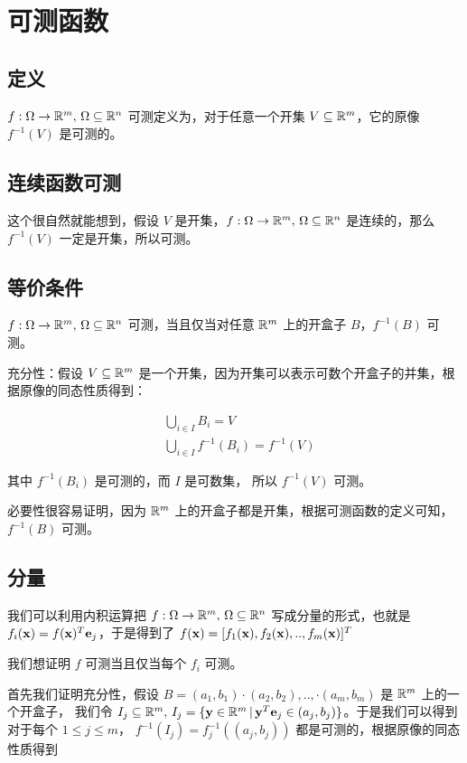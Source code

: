 \renewcommand{\f}{f: \Omega \to \R^m,\, \Omega \subseteq \R^n }
\section{可测函数}

\subsection{定义}

$\f$ 可测定义为，对于任意一个开集 $V \subseteq \mathbb{R}^m$，它的原像 $f^{-1}(V)$ 是可测的。

\subsection{连续函数可测}

这个很自然就能想到，假设 $V$ 是开集，$\f$ 是连续的，那么 $f^{-1}(V)$ 一定是开集，所以可测。

\subsection{等价条件}

$\f$ 可测，当且仅当对任意 $\mathbb{R}^m$ 上的开盒子 $B$，$f^{-1}(B)$ 可测。

充分性：假设 $V \subseteq \mathbb{R}^m$ 是一个开集，因为开集可以表示可数个开盒子的并集，根据原像的同态性质得到：

\begin{align*}
& \bigcup_{i \in I}B_i = V \\
& \bigcup_{i \in I}f^{-1}(B_i) = f^{-1}(V)
\end{align*}

其中 $f^{-1}(B_i)$ 是可测的，而 $I$ 是可数集， 所以 $f^{-1}(V)$ 可测。 

必要性很容易证明，因为 $\mathbb{R}^m$  上的开盒子都是开集，根据可测函数的定义可知， $f^{-1}(B)$ 可测。


\subsection{分量}

我们可以利用内积运算把 $\f$ 写成分量的形式，也就是 $f_i(\mathbf{x}) = f(\mathbf{x})^T \mathbf{e}_j$，于是得到了 
$f(\mathbf{x}) = [f_1(\mathbf{x}), f_2(\mathbf{x}), .., f_m(\mathbf{x})]^T $

我们想证明 $f$ 可测当且仅当每个 $f_i$ 可测。

首先我们证明充分性，假设 $B=(a_1,b_1) \cdot (a_2, b_2),.., \cdot(a_m,b_m)$ 是 $\mathbb{R}^m$ 上的一个开盒子，
我们令 $I_j \subseteq \mathbb{R}^m,\, I_j = \{ \mathbf{y} \in \mathbb{R}^m \,\vert\, \mathbf{y}^T \mathbf{e}_j \in (a_j, b_j)\}$。于是我们可以得到对于每个 $1 \le j \le m$，
$f^{-1}(I_j) = f_j^{-1}((a_j,b_j))$ 都是可测的，根据原像的同态性质得到

